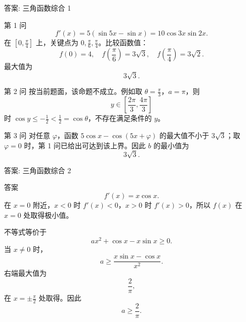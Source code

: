 ﻿\documentclass[aspectratio=169,10pt]{ctexbeamer}
\begin{document}
\begin{frame}[t]{答案: 三角函数综合 1}
\tiny
\begin{block}{第 1 问}
\[
f'(x)=5(\sin5x-\sin x)=10\cos3x\sin2x.
\]
在 $\left[0,\frac\pi4\right]$ 上，关键点为 $0,\frac\pi6,\frac\pi4$。比较函数值：
\[
f(0)=4,\quad f\left(\frac\pi6\right)=3\sqrt3,\quad f\left(\frac\pi4\right)=3\sqrt2.
\]
最大值为
\[
3\sqrt3.
\]
\end{block}
\begin{block}{第 2 问}
按当前题面，该命题不成立。例如取 $\theta=\frac\pi3$，$a=\pi$，则
\[
y\in\left[\frac{2\pi}3,\frac{4\pi}3\right]
\]
时 $\cos y\le-\frac12<\frac12=\cos\theta$，不存在满足条件的 $y$。
\end{block}
\begin{block}{第 3 问}
对任意 $\varphi$，函数 $5\cos x-\cos(5x+\varphi)$ 的最大值不小于 $3\sqrt3$；取 $\varphi=0$ 时，第 1 问已给出可达到该上界。因此 $b$ 的最小值为
\[
3\sqrt3.
\]
\end{block}
\end{frame}

\begin{frame}[t]{答案: 三角函数综合 2}
\tiny
\begin{block}{答案}
\[
f'(x)=x\cos x.
\]
在 $x=0$ 附近，$x<0$ 时 $f'(x)<0$，$x>0$ 时 $f'(x)>0$，所以 $f(x)$ 在 $x=0$ 处取得极小值。

不等式等价于
\[
ax^2+\cos x-x\sin x\ge0.
\]
当 $x\ne0$ 时，
\[
a\ge \frac{x\sin x-\cos x}{x^2}.
\]
右端最大值为
\[
\frac2\pi,
\]
在 $x=\pm\frac\pi2$ 处取得。因此
\[
a\ge\frac2\pi.
\]
\end{block}
\end{frame}

\fi
\end{document}

